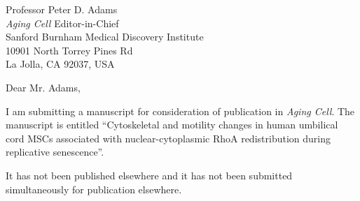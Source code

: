 \documentclass[11pt]{letter} %
\begin{document}

\begin{letter}{
Professor Peter D. Adams \\
\emph{Aging Cell} Editor-in-Chief \\
Sanford Burnham Medical Discovery Institute \\
10901 North Torrey Pines Rd \\
La Jolla, CA 92037, USA\\}

\iffalse
\begin{center}
\large\bf Dr. Danila Bobkov \\ %
4 Tikhoretsky\\ St-Petersburg, Russia 195251 \\ (999) 043-5439 %
\end{center}
\vfill
\fi
\signature{Dr. Danila Bobkov \\
Institute of Cytology RAS \\
4 Tikhoretsky ave. \\
St-Petersburg, 194064, Russia \\
Tel. :+7(999) 043-5439 \\
E-mail: bobkov@incras.ru} %


\opening{Dear Mr. Adams,}

I am submitting a manuscript for consideration of publication in \emph{Aging Cell}.
The manuscript is entitled
“Cytoskeletal and motility changes in human umbilical cord MSCs associated with nuclear-cytoplasmic RhoA redistribution during replicative senescence”.

It has not been published elsewhere and it has not been submitted simultaneously for publication elsewhere.


\end{letter}
\end{document}
